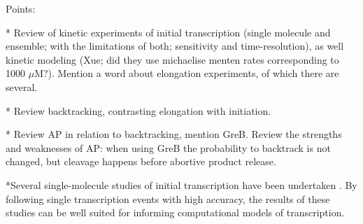 Points:

* Review of kinetic experiments of initial transcription (single molecule and
ensemble; with the limitations of both; sensitivity and time-resolution), as
well kinetic modeling (Xue; did they use michaelise menten rates corresponding
to 1000 $\mu$M?). Mention a word about elongation experiments, of which there
are several.

* Review backtracking, contrasting elongation with initiation.

* Review AP in relation to backtracking, mention GreB. Review the strengths
and weaknesses of AP: when using GreB the probability to backtrack is not
changed, but cleavage happens before abortive product release.

*Several single-molecule studies of initial transcription have been undertaken
\cite{margeat_direct_2006,revyakin_abortive_2006,kapanidis_retention_2005}.
By following single transcription events with high accuracy, the results of
these studies can be well suited for informing computational models of
transcription. 
